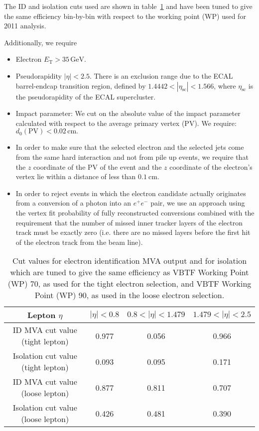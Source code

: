 The ID and isolation cuts used are shown in table~\ref{tab:EleID} and
have been tuned to give the same efficiency bin-by-bin with respect to
the working point (WP) used for 2011 analysis.

Additionally, we require
\begin{itemize}
\item Electron $E_\mathrm{T} > 35\,\mathrm{GeV}$.
\item Pseudorapidity $|\eta| < 2.5$. There is an exclusion range due
        to the ECAL barrel-endcap transition region, defined by
        $1.4442 < |\eta_{\mathrm{sc}}| < 1.566$, where
        $\eta_{\mathrm{sc}}$ is the pseudorapidity of the ECAL
        supercluster.
\item Impact parameter: We cut on the absolute value of the impact
       parameter calculated with respect to the average primary vertex (PV). We
       require: $d_0(\mathrm{PV}) < 0.02\,\mathrm{cm}.$
\item In order to make sure that the selected electron and the selected
jets come from the same hard interaction and not from pile up events,
we require that the $z$ coordinate of the PV of the event and the $z$
coordinate of the electron's vertex lie within a distance of
less than $0.1~\mathrm{cm}$.

\item 
In order to reject events in which the electron candidate actually
originates from a conversion of a photon into an $e^{+}e^{-}$ pair, we
use an approach using the vertex fit probability of fully
reconstructed conversions combined with the requirement that the
number of missed inner tracker layers of the electron track must be
exactly zero (i.e. there are no missed layers before the first hit of
the electron track from the beam line). 
\end{itemize}
\begin{table}[bthp]
\begin{center}
{\footnotesize
\begin{tabular}{|c|c|c|c|}
\hline
Lepton $\eta$ & $|\eta| < 0.8$ & $0.8 < |\eta| < 1.479$ & $1.479 < |\eta| < 2.5$  \\
\hline
ID MVA cut value (tight lepton) & 0.977 & 0.056 & 0.966 \\
Isolation cut value (tight lepton) & 0.093 & 0.095 & 0.171 \\
ID MVA cut value (loose lepton) & 0.877 & 0.811 & 0.707 \\
Isolation cut value (loose lepton) & 0.426 & 0.481 & 0.390 \\
\hline
\end{tabular}
\caption[.]{\label{tab:EleID} Cut values for electron identification
MVA output and for isolation which are tuned to give the same
efficiency as VBTF Working Point (WP) 70, as used for the tight
electron selection, and VBTF Working Point (WP) 90, as used in the
loose electron selection.}}
\end{center}
\end{table}

